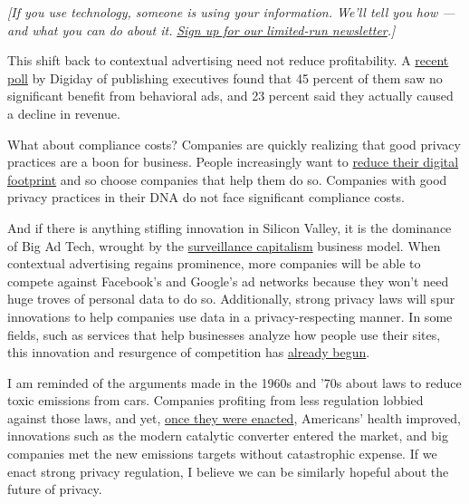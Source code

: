 \emph{{[}If you use technology, someone is using your information. We'll
tell you how --- and what you can do about it.}
\href{https://www.nytimes.com/newsletters/privacy-project?action=click\&module=Intentional\&pgtype=Article}{\emph{Sign
up for our limited-run newsletter}}\emph{.{]}}

This shift back to contextual advertising need not reduce profitability.
A
\href{https://digiday.com/media/digiday-research-most-publishers-dont-benefit-from-behavioral-ad-targeting/}{recent
poll} by Digiday of publishing executives found that 45 percent of them
saw no significant benefit from behavioral ads, and 23 percent said they
actually caused a decline in revenue.

What about compliance costs? Companies are quickly realizing that good
privacy practices are a boon for business. People increasingly want to
\href{https://www.pewresearch.org/fact-tank/2018/09/05/americans-are-changing-their-relationship-with-facebook/}{reduce
their digital footprint} and so choose companies that help them do so.
Companies with good privacy practices in their DNA do not face
significant compliance costs.

And if there is anything stifling innovation in Silicon Valley, it is
the dominance of Big Ad Tech, wrought by the
\href{https://www.washingtonpost.com/opinions/surveillance-capitalism-has-gone-rogue-we-must-curb-its-excesses/2019/01/24/be463f48-1ffa-11e9-9145-3f74070bbdb9_story.html?utm_term=.5e058ae81558}{surveillance
capitalism} business model. When contextual advertising regains
prominence, more companies will be able to compete against Facebook's
and Google's ad networks because they won't need huge troves of personal
data to do so. Additionally, strong privacy laws will spur innovations
to help companies use data in a privacy-respecting manner. In some
fields, such as services that help businesses analyze how people use
their sites, this innovation and resurgence of competition has
\href{https://www.fastcompany.com/90300072/its-time-to-ditch-google-analytics}{already
begun}.

I am reminded of the arguments made in the 1960s and '70s about laws to
reduce toxic emissions from cars. Companies profiting from less
regulation lobbied against those laws, and yet,
\href{https://www.epa.gov/transportation-air-pollution-and-climate-change/accomplishments-and-success-air-pollution-transportation}{once
they were enacted}, Americans' health improved, innovations such as the
modern catalytic converter entered the market, and big companies met the
new emissions targets without catastrophic expense. If we enact strong
privacy regulation, I believe we can be similarly hopeful about the
future of privacy.

